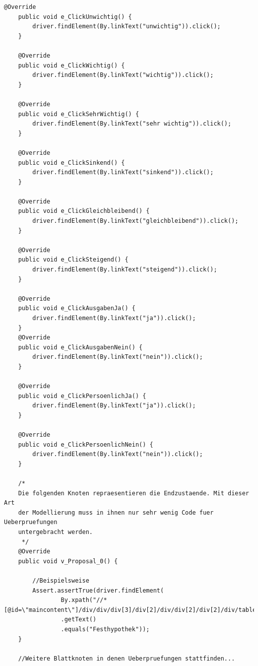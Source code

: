 \begin{lstlisting}[caption=ImexTest.java, label=code:gw_selenium]
    @Override
    public void e_ClickUnwichtig() {
        driver.findElement(By.linkText("unwichtig")).click();
    }

    @Override
    public void e_ClickWichtig() {
        driver.findElement(By.linkText("wichtig")).click();
    }

    @Override
    public void e_ClickSehrWichtig() {
        driver.findElement(By.linkText("sehr wichtig")).click();
    }

    @Override
    public void e_ClickSinkend() {
        driver.findElement(By.linkText("sinkend")).click();
    }

    @Override
    public void e_ClickGleichbleibend() {
        driver.findElement(By.linkText("gleichbleibend")).click();
    }

    @Override
    public void e_ClickSteigend() {
        driver.findElement(By.linkText("steigend")).click();
    }

    @Override
    public void e_ClickAusgabenJa() {
        driver.findElement(By.linkText("ja")).click();
    }
    @Override
    public void e_ClickAusgabenNein() {
        driver.findElement(By.linkText("nein")).click();
    }

    @Override
    public void e_ClickPersoenlichJa() {
        driver.findElement(By.linkText("ja")).click();
    }

    @Override
    public void e_ClickPersoenlichNein() {
        driver.findElement(By.linkText("nein")).click();
    }

    /*
    Die folgenden Knoten repraesentieren die Endzustaende. Mit dieser Art
    der Modellierung muss in ihnen nur sehr wenig Code fuer Ueberpruefungen
    untergebracht werden.
     */
    @Override
    public void v_Proposal_0() {

        //Beispielsweise
        Assert.assertTrue(driver.findElement(
                By.xpath("//*[@id=\"maincontent\"]/div/div/div[3]/div[2]/div/div[2]/div[2]/div/table[1]/thead/tr/th[1]"))
                .getText()
                .equals("Festhypothek"));
    }

    //Weitere Blattknoten in denen Ueberpruefungen stattfinden...
\end{lstlisting}

